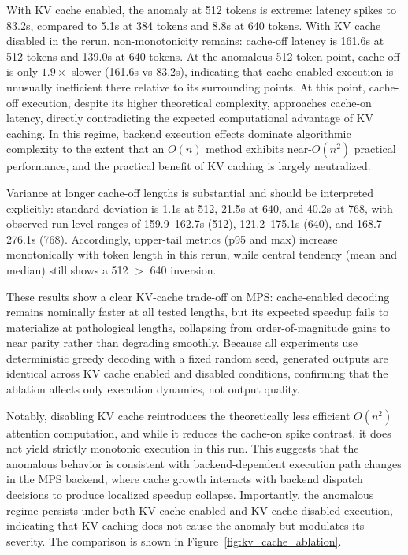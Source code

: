 \documentclass{article}
\begin{document}
With KV cache enabled, the anomaly at 512 tokens is extreme: latency spikes to 83.2s, compared to 5.1s at 384 tokens and 8.8s at 640 tokens.
With KV cache disabled in the rerun, non-monotonicity remains: cache-off latency is 161.6s at 512 tokens and 139.0s at 640 tokens.
At the anomalous 512-token point, cache-off is only $1.9\times$ slower (161.6s vs 83.2s), indicating that cache-enabled execution is unusually inefficient there relative to its surrounding points.
At this point, cache-off execution, despite its higher theoretical complexity, approaches cache-on latency, directly contradicting the expected computational advantage of KV caching. In this regime, backend execution effects dominate algorithmic complexity to the extent that an $O(n)$ method exhibits near-$O(n^2)$ practical performance, and the practical benefit of KV caching is largely neutralized.

Variance at longer cache-off lengths is substantial and should be interpreted explicitly: standard deviation is 1.1s at 512, 21.5s at 640, and 40.2s at 768, with observed run-level ranges of 159.9--162.7s (512), 121.2--175.1s (640), and 168.7--276.1s (768). Accordingly, upper-tail metrics (p95 and max) increase monotonically with token length in this rerun, while central tendency (mean and median) still shows a 512 $>$ 640 inversion.

These results show a clear KV-cache trade-off on MPS: cache-enabled decoding remains nominally faster at all tested lengths, but its expected speedup fails to materialize at pathological lengths, collapsing from order-of-magnitude gains to near parity rather than degrading smoothly.
Because all experiments use deterministic greedy decoding with a fixed random seed, generated outputs are identical across KV cache enabled and disabled conditions, confirming that the ablation affects only execution dynamics, not output quality.

Notably, disabling KV cache reintroduces the theoretically less efficient $O(n^2)$ attention computation, and while it reduces the cache-on spike contrast, it does not yield strictly monotonic execution in this run. This suggests that the anomalous behavior is consistent with backend-dependent execution path changes in the MPS backend, where cache growth interacts with backend dispatch decisions to produce localized speedup collapse. Importantly, the anomalous regime persists under both KV-cache-enabled and KV-cache-disabled execution, indicating that KV caching does not cause the anomaly but modulates its severity. The comparison is shown in Figure~\ref{fig:kv_cache_ablation}.
\end{document}
